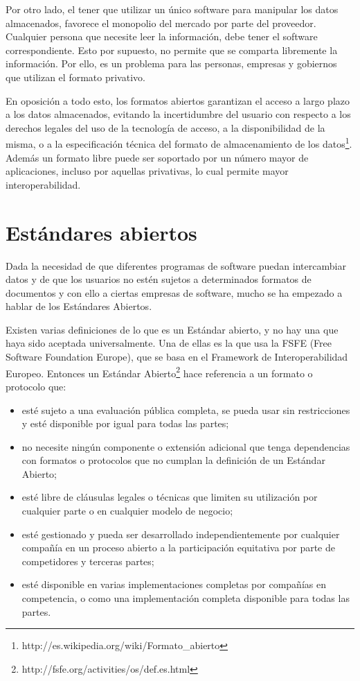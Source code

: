 \documentclass[12pt]{article}
\begin{document}
Por otro lado, el tener que utilizar un único software para manipular los datos almacenados, favorece el monopolio del mercado por parte del proveedor. Cualquier persona que necesite leer la información, debe tener el software correspondiente. Esto por supuesto, no permite que se comparta libremente la información. Por ello, es un problema para las personas, empresas y gobiernos que utilizan el formato privativo.

En oposición a todo esto, los formatos abiertos garantizan el acceso a largo plazo a los datos almacenados, evitando la incertidumbre del usuario con respecto a los derechos legales del uso de la tecnología de acceso, a la disponibilidad de la misma, o a la especificación técnica del formato de almacenamiento de los datos\footnote{http://es.wikipedia.org/wiki/Formato\_abierto}. Además un formato libre puede ser soportado por un número mayor de aplicaciones, incluso por aquellas privativas, lo cual permite mayor interoperabilidad.  

\section*{Estándares abiertos}

Dada la necesidad de que diferentes programas de software puedan intercambiar datos y de que los usuarios no estén sujetos a determinados formatos de documentos y con ello a ciertas empresas de software, mucho se ha empezado a hablar de los Estándares Abiertos. 

Existen varias definiciones de lo que es un Estándar abierto, y no hay una que haya sido aceptada universalmente. Una de ellas es la que usa la FSFE (Free Software Foundation Europe), que se basa en el Framework de Interoperabilidad Europeo. Entonces un Estándar Abierto\footnote{http://fsfe.org/activities/os/def.es.html} hace referencia a un formato o protocolo que: 
\begin{itemize}
\item esté sujeto a una evaluación pública completa, se pueda usar sin restricciones y esté disponible por igual para todas las partes;
\item no necesite ningún componente o extensión adicional que tenga dependencias con formatos o protocolos que no cumplan la definición de un Estándar Abierto;
\item esté libre de cláusulas legales o técnicas que limiten su utilización por cualquier parte o en cualquier modelo de negocio;
\item esté gestionado y pueda ser desarrollado independientemente por cualquier compañía en un proceso abierto a la participación equitativa por parte de competidores y terceras partes;
\item esté disponible en varias implementaciones completas por compañías en competencia, o como una implementación completa disponible para todas las partes.
\end{itemize}
\end{document}
